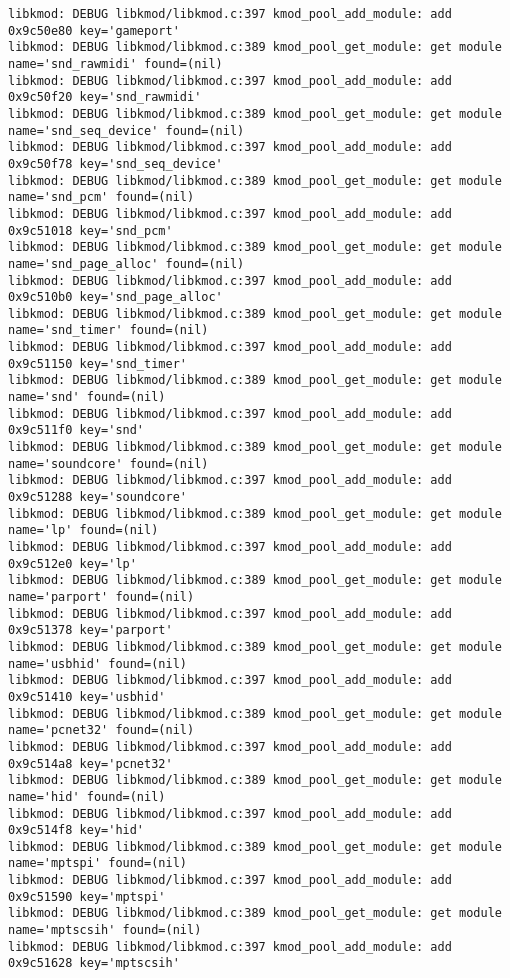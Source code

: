 \documentclass[11pt,a4paper]{article}
\begin{document}
{\begin{shaded}
\begin{verbatim}
libkmod: DEBUG libkmod/libkmod.c:397 kmod_pool_add_module: add 0x9c50e80 key='gameport'
libkmod: DEBUG libkmod/libkmod.c:389 kmod_pool_get_module: get module name='snd_rawmidi' found=(nil)
libkmod: DEBUG libkmod/libkmod.c:397 kmod_pool_add_module: add 0x9c50f20 key='snd_rawmidi'
libkmod: DEBUG libkmod/libkmod.c:389 kmod_pool_get_module: get module name='snd_seq_device' found=(nil)
libkmod: DEBUG libkmod/libkmod.c:397 kmod_pool_add_module: add 0x9c50f78 key='snd_seq_device'
libkmod: DEBUG libkmod/libkmod.c:389 kmod_pool_get_module: get module name='snd_pcm' found=(nil)
libkmod: DEBUG libkmod/libkmod.c:397 kmod_pool_add_module: add 0x9c51018 key='snd_pcm'
libkmod: DEBUG libkmod/libkmod.c:389 kmod_pool_get_module: get module name='snd_page_alloc' found=(nil)
libkmod: DEBUG libkmod/libkmod.c:397 kmod_pool_add_module: add 0x9c510b0 key='snd_page_alloc'
libkmod: DEBUG libkmod/libkmod.c:389 kmod_pool_get_module: get module name='snd_timer' found=(nil)
libkmod: DEBUG libkmod/libkmod.c:397 kmod_pool_add_module: add 0x9c51150 key='snd_timer'
libkmod: DEBUG libkmod/libkmod.c:389 kmod_pool_get_module: get module name='snd' found=(nil)
libkmod: DEBUG libkmod/libkmod.c:397 kmod_pool_add_module: add 0x9c511f0 key='snd'
libkmod: DEBUG libkmod/libkmod.c:389 kmod_pool_get_module: get module name='soundcore' found=(nil)
libkmod: DEBUG libkmod/libkmod.c:397 kmod_pool_add_module: add 0x9c51288 key='soundcore'
libkmod: DEBUG libkmod/libkmod.c:389 kmod_pool_get_module: get module name='lp' found=(nil)
libkmod: DEBUG libkmod/libkmod.c:397 kmod_pool_add_module: add 0x9c512e0 key='lp'
libkmod: DEBUG libkmod/libkmod.c:389 kmod_pool_get_module: get module name='parport' found=(nil)
libkmod: DEBUG libkmod/libkmod.c:397 kmod_pool_add_module: add 0x9c51378 key='parport'
libkmod: DEBUG libkmod/libkmod.c:389 kmod_pool_get_module: get module name='usbhid' found=(nil)
libkmod: DEBUG libkmod/libkmod.c:397 kmod_pool_add_module: add 0x9c51410 key='usbhid'
libkmod: DEBUG libkmod/libkmod.c:389 kmod_pool_get_module: get module name='pcnet32' found=(nil)
libkmod: DEBUG libkmod/libkmod.c:397 kmod_pool_add_module: add 0x9c514a8 key='pcnet32'
libkmod: DEBUG libkmod/libkmod.c:389 kmod_pool_get_module: get module name='hid' found=(nil)
libkmod: DEBUG libkmod/libkmod.c:397 kmod_pool_add_module: add 0x9c514f8 key='hid'
libkmod: DEBUG libkmod/libkmod.c:389 kmod_pool_get_module: get module name='mptspi' found=(nil)
libkmod: DEBUG libkmod/libkmod.c:397 kmod_pool_add_module: add 0x9c51590 key='mptspi'
libkmod: DEBUG libkmod/libkmod.c:389 kmod_pool_get_module: get module name='mptscsih' found=(nil)
libkmod: DEBUG libkmod/libkmod.c:397 kmod_pool_add_module: add 0x9c51628 key='mptscsih'

\end{verbatim}
\end{shaded}}
\end{document}
